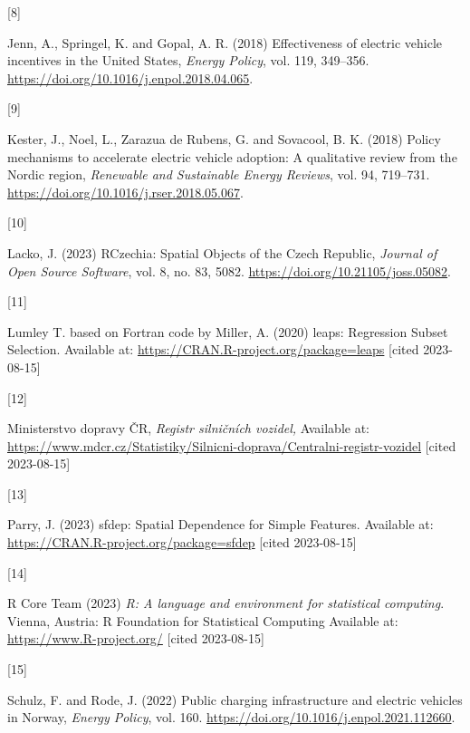 \documentclass{mmeproc}
\newlength{\cslhangindent}
\newlength{\csllabelwidth}
\newenvironment{CSLReferences}[2] %
 {%
  \setlength{\parindent}{0pt}
  \ifodd #1
  \fi
  \setlength{\parskip}{-2pt}
 }%
 {}
\newcommand{\CSLLeftMargin}[1]{\parbox[t]{\csllabelwidth}{#1}}
\newcommand{\CSLRightInline}[1]{\parbox[t]{\linewidth - \csllabelwidth}{#1}\break}
\begin{document}
\begin{CSLReferences}{0}{0}
\leavevmode{}%
\CSLLeftMargin{{[}8{]} }%
\CSLRightInline{Jenn, A., Springel, K. and Gopal, A. R. (2018) {Effectiveness
of electric vehicle incentives in the {United} {States},} \emph{Energy
Policy}, vol. 119, 349--356. \url{https://doi.org/10.1016/j.enpol.2018.04.065}.}

\leavevmode{}%
\CSLLeftMargin{{[}9{]} }%
\CSLRightInline{Kester, J., Noel,  L., Zarazua de Rubens,  G. and 
Sovacool, B. K. (2018) {Policy mechanisms to accelerate electric vehicle adoption:
{A} qualitative review from the {Nordic} region,} \emph{Renewable and
Sustainable Energy Reviews}, vol. 94, 719--731. \url{https://doi.org/10.1016/j.rser.2018.05.067}.}

\leavevmode{}%
\CSLLeftMargin{{[}10{]} }%
\CSLRightInline{Lacko, J. (2023)  {{RCzechia}: {Spatial} {Objects} of the
{Czech} {Republic},} \emph{Journal of Open Source Software}, vol. 8,
no. 83, 5082. \url{https://doi.org/10.21105/joss.05082}.}

\leavevmode{}%
\CSLLeftMargin{{[}11{]} }%
\CSLRightInline{Lumley T. based on Fortran code by Miller, A. (2020)
{{leaps}: {Regression} {Subset} {Selection}.} Available at:
\url{https://CRAN.R-project.org/package=leaps} {{[}cited 2023-08-15{]}}}

\leavevmode{}%
\CSLLeftMargin{{[}12{]} }%
\CSLRightInline{Ministerstvo dopravy ČR, \emph{Registr silničních
vozidel,} Available at:
\url{https://www.mdcr.cz/Statistiky/Silnicni-doprava/Centralni-registr-vozidel} {{[}cited 2023-08-15{]}}}

\leavevmode{}%
\CSLLeftMargin{{[}13{]} }%
\CSLRightInline{Parry, J. (2023) {{sfdep}: {Spatial} {Dependence} for
{Simple} {Features}.} Available at:
\url{https://CRAN.R-project.org/package=sfdep} {{[}cited 2023-08-15{]}}}

\leavevmode{}%
\CSLLeftMargin{{[}14{]} }%
\CSLRightInline{R Core Team (2023) \emph{R: A language and environment for
statistical computing}. Vienna, Austria: R Foundation for Statistical
Computing Available at: \url{https://www.R-project.org/} {{[}cited 2023-08-15{]}}}

\leavevmode{}%
\CSLLeftMargin{{[}15{]} }%
\CSLRightInline{Schulz, F. and Rode, J. (2022) {Public charging infrastructure
and electric vehicles in {Norway},} \emph{Energy Policy}, vol. 160. 
\url{https://doi.org/10.1016/j.enpol.2021.112660}.}


\end{CSLReferences}
\end{document}
